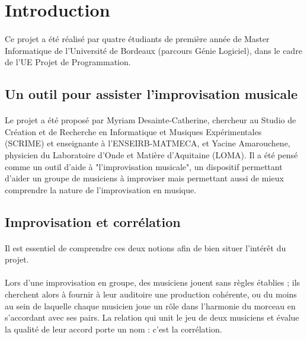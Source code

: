 
\section{Introduction}
\paragraph{}
Ce projet a été réalisé par quatre étudiants de première année de
Master Informatique de l'Université de Bordeaux (parcours Génie
Logiciel), dans le cadre de l'UE Projet de Programmation.

\subsection{Un outil pour assister l'improvisation musicale}
\paragraph{}
Le projet a été proposé par Myriam Desainte-Catherine, chercheur au
Studio de Création et de Recherche en Informatique et Musiques
Expérimentales (SCRIME) et enseignante à l'ENSEIRB-MATMECA, et Yacine
Amarouchene, physicien du Laboratoire d'Onde et Matière d'Aquitaine
(LOMA). Il a été pensé comme un outil d'aide à "l'improvisation
musicale", un dispositif permettant d'aider un groupe de musiciens à
improviser mais permettant aussi de mieux comprendre la nature de
l'improvisation en musique.

\subsection{Improvisation et corrélation}
\paragraph{}

Il est essentiel de comprendre ces deux notions afin de bien situer
l'intérêt du projet.

\paragraph{}
Lors d'une improvisation en groupe, des musiciens jouent sans règles
établies ; ils cherchent alors à fournir à leur auditoire une
production cohérente, ou du moins au sein de laquelle chaque musicien
joue un rôle dans l'harmonie du morceau en s'accordant avec ses
pairs. La relation qui unit le jeu de deux musiciens et évalue la
qualité de leur accord porte un nom : c'est la corrélation.
